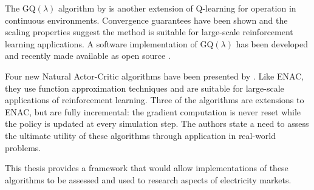 The GQ$(\lambda)$ algorithm by  is another extension of Q-learning
for operation in continuous environments.  Convergence guarantees have been
shown and the scaling properties suggest the method is suitable for large-scale
reinforcement learning applications.  A software implementation of GQ$(\lambda)$
has been developed and recently made available as open source
\cite{lincoln:pyreto}.

Four new Natural Actor-Critic algorithms have been presented by
. Like ENAC, they use function approximation techniques and
are suitable for large-scale applications of reinforcement learning.  Three of
the algorithms are extensions to ENAC, but are fully incremental: the gradient
computation is never reset while the policy is updated at every simulation step.
 The authors state a need to assess the ultimate utility of these algorithms
through application in real-world problems.

This thesis provides a framework that would allow implementations of these
algorithms to be assessed and used to research aspects of electricity
markets.

